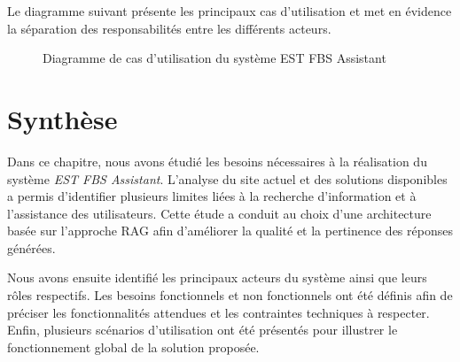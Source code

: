 \documentclass[12pt,a4paper]{report}
\begin{document}
Le diagramme suivant présente les principaux cas d’utilisation et met en évidence la séparation des responsabilités entre les différents acteurs.

\begin{figure}[H]
\centering


\caption{Diagramme de cas d’utilisation du système EST FBS Assistant}
\label{fig:usecase}
\end{figure}

\newpage
\section{Synthèse}

Dans ce chapitre, nous avons étudié les besoins nécessaires à la réalisation du système \textit{EST FBS Assistant}. L’analyse du site actuel et des solutions disponibles a permis d’identifier plusieurs limites liées à la recherche d’information et à l’assistance des utilisateurs. Cette étude a conduit au choix d’une architecture basée sur l’approche RAG afin d’améliorer la qualité et la pertinence des réponses générées.

Nous avons ensuite identifié les principaux acteurs du système ainsi que leurs rôles respectifs. Les besoins fonctionnels et non fonctionnels ont été définis afin de préciser les fonctionnalités attendues et les contraintes techniques à respecter. Enfin, plusieurs scénarios d’utilisation ont été présentés pour illustrer le fonctionnement global de la solution proposée.
\end{document}

